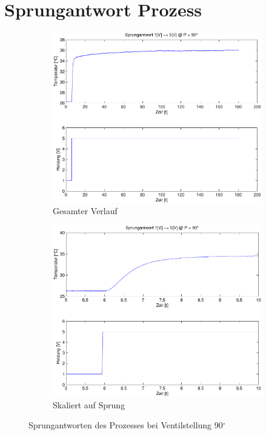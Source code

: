 \section{Sprungantwort Prozess}

\begin{figure}[h!]
	\centering
	\begin{subfigure}{0.475\textwidth}
		\includegraphics[width=1\textwidth]{03/step_full.pdf}
		\caption{Gesamter Verlauf}
	\end{subfigure}
	\hfill{}
	\begin{subfigure}{0.475\textwidth}
		\includegraphics[width=1\textwidth]{03/step_full_scale.pdf}
		\caption{Skaliert auf Sprung}
	\end{subfigure}
	\caption{Sprungantworten des Prozesses bei Ventilstellung 90$^\circ$}
	\label{fig:03a}
\end{figure}

